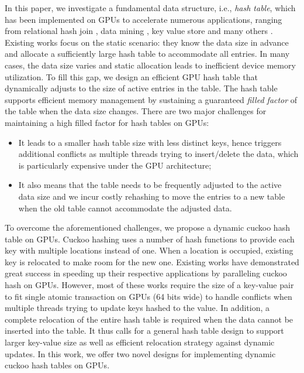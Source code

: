 In this paper, we investigate a fundamental data structure, i.e., \emph{hash table}, which has been implemented on GPUs to accelerate numerous applications, ranging from relational hash join \cite{he2008relational,he2009relational,heimel2013hardware}, data mining \cite{pan2011fast,zhou2010parallel,zhong2014medusa},  key value store \cite{zhang2015mega,hetherington2015memcachedgpu,breslow2016horton} and many others \cite{bowers2010parallel,pan2010efficient,garcia2011coherent,niessner2013real,wu2015gpu}. Existing works \cite{alcantara2009real,zhang2015mega,hong2010mapcg,hetherington2015memcachedgpu,breslow2016horton} focus on the static scenario: they know the data size in advance and allocate a sufficiently large hash table to accommodate all entries. In many cases, the data size varies and static allocation leads to inefficient device memory utilization. To fill this gap, we design an efficient GPU hash table that dynamically adjusts to the size of active entries in the table. The hash table supports efficient memory management by sustaining a guaranteed \emph{filled factor} of the table when the data size changes. There are two major challenges for maintaining a high filled factor for hash tables on GPUs:
\begin{itemize}
	\item It leads to a smaller hash table size with less distinct keys, hence triggers additional conflicts as multiple threads trying to insert/delete the data, which is particularly expensive under the GPU architecture;
	\item It also means that the table needs to be frequently adjusted to the active data size and we incur costly rehashing to move the entries to a new table when the old table cannot accommodate the adjusted data. 
\end{itemize}

To overcome the aforementioned challenges, we propose a dynamic cuckoo hash table on GPUs. Cuckoo hashing \cite{pagh2004cuckoo} uses a number of hash functions to provide each key with multiple locations instead of one. When a location is occupied, existing key is relocated to make room for the new one. Existing works \cite{alcantara2009real,alcantara2011building,zhang2015mega,breslow2016horton} have demonstrated great success in speeding up their respective applications by paralleling cuckoo hash on GPUs. 
However, most of these works require the size of a key-value pair to fit single atomic transaction on GPUs (64 bits wide) to handle conflicts when multiple threads trying to update keys hashed to the value.
In addition, a complete relocation of the entire hash table is required when the data cannot be inserted into the table. 
It thus calls for a general hash table design to support larger key-value size as well as efficient relocation strategy against dynamic updates.
In this work, we offer two novel designs for implementing dynamic cuckoo hash tables on GPUs. 

